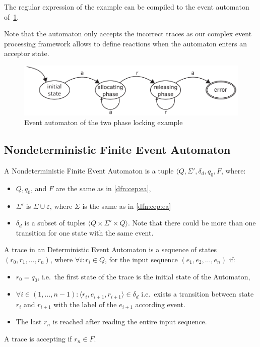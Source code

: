 		The regular expression of the example can be compiled to the event automaton of~\cref{fig:cep:fa}. 

		Note that the automaton only accepts the incorrect traces as our complex event processing framework allows to define reactions when the automaton enters an acceptor state.
		
		\begin{figure}[h]
		\centering
		\includegraphics[width=0.7\linewidth]{figures/chapter_4/allocating_simple}
		\caption{Event automaton of the two phase locking example \redraw}
		\label{fig:cep:fa}
		\end{figure}
	
	\subsection{Nondeterministic Finite Event Automaton}
	
	\begin{dfn}	
		\label{dfn:cep:nea}
		A Nondeterministic Finite Event Automaton is a tuple $\langle Q,\Sigma',\delta_d,q_0, F$, where:
		\begin{itemize}
			\item $Q, q_0$, and $F$ are the same as in \cref{dfn:cep:ea},
			\item $\Sigma'$ is $\Sigma \cup \varepsilon$, where $\Sigma$ is the same as in \cref{dfn:cep:ea}
			\item $\delta_d$ is a subset of tuples $\langle Q \times \Sigma' \times Q \rangle$.
			Note that there could be more than one transition for one state with the same event.
		\end{itemize}
	\end{dfn}

	\begin{dfn}
		\label{dfn:cep:nea:trace}
		A trace in an Deterministic Event Automaton is
		a sequence of states $(r_0, r_1, \dots, r_n)$, where $\forall i: r_i \in Q$,
		for the input sequence $(e_1, e_2, \dots, e_n)$ if:
		\begin{itemize}
			\item$r_0 = q_0$, i.e.~the first state of the trace is the initial state of the Automaton,
			\item $\forall i \in (1,\dots,n-1): \langle r_i, e_{i+1}, r_{i+1} \rangle \in \delta_d$ i.e.~exists a transition between state $r_i$ and $r_{i+1}$ with the label of the $e_{i+1}$ according event.	
			\item The last $r_n$ is reached after reading the entire input sequence.	
		\end{itemize}
		A trace is accepting if $r_n \in F$.
	\end{dfn}
		
